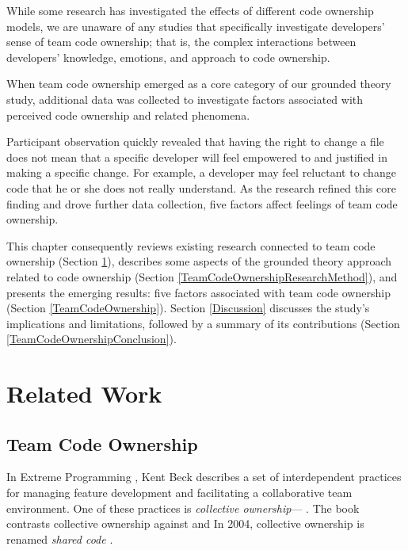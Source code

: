 While some research has investigated the effects of different code ownership models, we are unaware of any studies that specifically investigate developers' sense of team code ownership; that is, the complex interactions between developers' knowledge, emotions, and approach to code ownership.  


When team code ownership emerged as a core category of our grounded theory study, additional data was collected to investigate factors associated with perceived code ownership and related phenomena. 


Participant observation quickly revealed that having the right to change a file does not mean that a specific developer will feel empowered to and justified in making a specific change. For example, a developer may feel reluctant to change code that he or she does not really understand. As the research refined this core finding and drove further data collection, five factors affect feelings of team code ownership. 


This chapter consequently reviews existing research connected to team code ownership (Section \ref{TeamCodeOwnnershipRelatedWork}), describes some aspects of the grounded theory approach related to code ownership (Section \ref{TeamCodeOwnershipResearchMethod}), and presents the emerging results: five factors associated with team code ownership (Section \ref{TeamCodeOwnership}). Section \ref{Discussion} discusses the study's implications and limitations, followed by a summary of its contributions (Section \ref{TeamCodeOwnershipConclusion}).
\section{Related Work}
\label{TeamCodeOwnnershipRelatedWork}


\subsection{Team Code Ownership}
In Extreme Programming \cite{BeckExtremeProgramming2004}, Kent Beck describes a set of interdependent practices for managing feature development and facilitating a collaborative team environment. One of these practices is \textit{collective ownership}--- \cite{BeckExtremeProgramming1999}. The book contrasts collective ownership against  and  In 2004, collective ownership is renamed \textit{shared code} \cite{BeckExtremeProgramming2004}.


